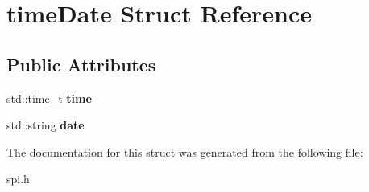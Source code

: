 \hypertarget{structtimeDate}{\section{time\-Date Struct Reference}
\label{structtimeDate}
}
\subsection*{Public Attributes}
\begin{DoxyCompactItemize}
\item 
\hypertarget{structtimeDate_a4513a3b33d516596a3270a42889d1d77}{std\-::time\-\_\-t {\bfseries time}}\label{structtimeDate_a4513a3b33d516596a3270a42889d1d77}

\item 
\hypertarget{structtimeDate_aba1a6fdf27de686648a1576d29833a9a}{std\-::string {\bfseries date}}\label{structtimeDate_aba1a6fdf27de686648a1576d29833a9a}

\end{DoxyCompactItemize}


The documentation for this struct was generated from the following file\-:\begin{DoxyCompactItemize}
\item 
spi.\-h\end{DoxyCompactItemize}
